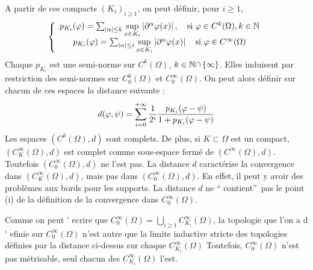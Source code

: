 \documentclass[3pt]{article}
\begin{document}
A partir de ces compacts $(K_{i})_{i\geq 1}$, on peut d\'{e}finir, pour $%
i\geq 1$,%
\begin{equation*}
\left\{ 
\begin{array}{c}
p_{K_{i}}(\varphi )=\sum_{\left\vert \alpha \right\vert \leq k}\underset{%
x\in K_{i}}{\sup }\left\vert \partial ^{\alpha }\varphi (x)\right\vert ,%
\text{ \ \ si }\varphi \in C^{k}(\Omega ),k\in \mathbb{N} \\ 
p_{K_{i}}(\varphi )=\sum_{\left\vert \alpha \right\vert \leq i}\underset{%
x\in K_{i}}{\sup }\left\vert \partial ^{\alpha }\varphi (x)\right\vert \text{
\ \ si }\varphi \in C^{\infty }(\Omega )%
\end{array}%
\right. 
\end{equation*}%
Chaque $p_{K_{i}}$ est une semi-norme sur $C^{k}(\Omega )$, $k\in \mathbb{%
N\cap }\left\{ \infty \right\} $. Elles induisent par restriction des
semi-normes sur $C_{0}^{k}(\Omega )$ et $C_{0}^{\infty }(\Omega ).$ On peut
alors d\'{e}finir sur chacun de ces espaces la distance suivante :%
\begin{equation*}
d(\varphi ,\psi )=\sum\limits_{i=0}^{+\infty }\frac{1}{2^{i}}\frac{%
p_{K_{i}}(\varphi -\psi )}{1+p_{K_{i}}(\varphi -\psi )}
\end{equation*}%
Les espaces $(C^{k}(\Omega ),d)$ sont complets. De plus, si $K\subset \Omega 
$ est un compact, $(C_{K}^{\infty }(\Omega ),d)$ est complet comme
sous-espace ferm\'{e} de $(C^{\infty }(\Omega ),d)$. Toutefois $%
(C_{0}^{\infty }(\Omega ),d)$ ne l'est pas. La distance $d$ caract\'{e}rise
la convergence dans $(C_{K}^{\infty }(\Omega ),d)$, mais pas dans $%
(C_{0}^{\infty }(\Omega ),d)$. En effet, il peut y avoir des probl\`{e}mes
aux bords pour les supports. La distance $d$ ne \textquotedblleft
contient\textquotedblright\ pas le point (i) de la d\'{e}finition de la
convergence dans $C_{0}^{\infty }(\Omega ).$

\bigskip 

Comme on peut 
\'{}%
ecrire que $C_{0}^{\infty }(\Omega )=\bigcup\nolimits_{i\geq
1}C_{K_{i}}^{\infty }(\Omega )$, la topologie que l'on a d%
\'{}%
efinie sur $C_{0}^{\infty }(\Omega )$ n'est autre que la limite inductive
stricte des topologies d\'{e}finies par la distance ci-dessus sur chaque $%
C_{K_{i}}^{\infty }(\Omega )$ Toutefois, $C_{0}^{\infty }(\Omega )$ n'est
pas m\'{e}trisable, seul chacun des $C_{K_{i}}^{\infty }(\Omega )$ l'est.

\bigskip 
\end{document}
